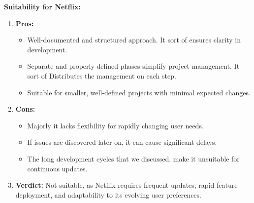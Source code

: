 \documentclass[a4paper,10pt,twoside]{article}
\begin{document}
\pagebreak
\textbf{Suitability for Netflix:}
\begin{enumerate}
    \item \textbf{Pros:}
    \begin{itemize}
        \item Well-documented and structured approach. It sort of ensures clarity in development.
        \item Separate and properly defined phases simplify project management. It sort of Distributes the management on each step.
        \item Suitable for smaller, well-defined projects with minimal expected changes.
    \end{itemize}
    \item \textbf{Cons:}
    \begin{itemize}
        \item Majorly it lacks flexibility for rapidly changing user needs.
        \item If issues are discovered later on, it can cause significant delays.
        \item The long development cycles that we discussed, make it unsuitable for continuous updates.
    \end{itemize}
    \item \textbf{Verdict:} Not suitable, as Netflix requires frequent updates, rapid feature deployment, and adaptability to its evolving user preferences.
\end{enumerate}
\end{document}
